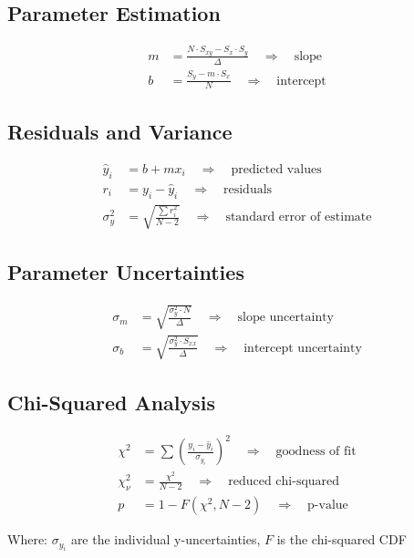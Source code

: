 \documentclass{article} %
\begin{document}
\subsection*{Parameter Estimation}
\begin{align*}
m &= \frac{N \cdot S_{xy} - S_x \cdot S_y}{\Delta} \quad \Rightarrow \quad \text{slope} \\
b &= \frac{S_y - m \cdot S_x}{N} \quad \Rightarrow \quad \text{intercept}
\end{align*}

\subsection*{Residuals and Variance}
\begin{align*}
\hat{y}_i &= b + m x_i \quad \Rightarrow \quad \text{predicted values} \\
r_i &= y_i - \hat{y}_i \quad \Rightarrow \quad \text{residuals} \\
\sigma_y^2 &= \sqrt{\frac{\sum r_i^2}{N-2}} \quad \Rightarrow \quad \text{standard error of estimate}
\end{align*}

\subsection*{Parameter Uncertainties}
\begin{align*}
\sigma_m &= \sqrt{\frac{\sigma_y^2 \cdot N}{\Delta}} \quad \Rightarrow \quad \text{slope uncertainty} \\
\sigma_b &= \sqrt{\frac{\sigma_y^2 \cdot S_{xx}}{\Delta}} \quad \Rightarrow \quad \text{intercept uncertainty}
\end{align*}

\subsection*{Chi-Squared Analysis}
\begin{align*}
\chi^2 &= \sum \left(\frac{y_i - \hat{y}_i}{\sigma_{y_i}}\right)^2 \quad \Rightarrow \quad \text{goodness of fit} \\
\chi_\nu^2 &= \frac{\chi^2}{N-2} \quad \Rightarrow \quad \text{reduced chi-squared} \\
p &= 1 - F(\chi^2, N-2) \quad \Rightarrow \quad \text{p-value}
\end{align*}

Where: $\sigma_{y_i}$ are the individual y-uncertainties, $F$ is the chi-squared CDF
\end{document}
